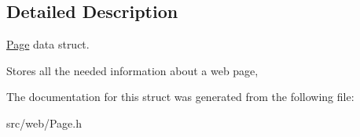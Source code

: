 \subsection{Detailed Description}
\hyperlink{structPage}{Page} data struct. 

Stores all the needed information about a web page, 

The documentation for this struct was generated from the following file\+:\begin{DoxyCompactItemize}
\item 
src/web/Page.\+h\end{DoxyCompactItemize}
